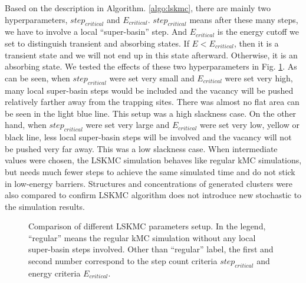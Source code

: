 Based on the description in Algorithm. \ref{algo:lskmc}, there are mainly two hyperparameters, $step_{critical}$ and $E_{critical}$. $step_{critical}$ means after these many steps, we have to involve a local ``super-basin'' step. And $E_{critical}$ is the energy cutoff we set to distinguish transient and absorbing states. If $E < E_{critical}$, then it is a transient state and we will not end up in this state afterward. Otherwise, it is an absorbing state. We tested the effects of these two hyperparameters in Fig. \ref{Chap:Al/Vac:fig:lskmc_time}. As can be seen, when $step_{critical}$ were set very small and $E_{critical}$ were set very high, many local super-basin steps would be included and the vacancy will be pushed relatively farther away from the trapping sites. There was almost no flat area can be seen in the light blue line. This setup was a high slackness case. On the other hand, when $step_{critical}$ were set very large and $E_{critical}$ were set very low, yellow or black line, less local super-basin steps will be involved and the vacancy will not be pushed very far away. This was a low slackness case. When intermediate values were chosen, the \ac{LSKMC} simulation behaves like regular \ac{kMC} simulations, but needs much fewer steps to achieve the same simulated time and do not stick in low-energy barriers.  Structures and concentrations of generated clusters were also compared to confirm \ac{LSKMC} algorithm does not introduce new stochastic to the simulation results.

\begingroup
\begin{figure}[!ht]
  \centering
\caption[Comparison of different \acf{LSKMC} parameters setup.]{Comparison of different \ac{LSKMC} parameters setup. In the legend, ``regular'' means the regular \ac{kMC} simulation without any local super-basin steps involved. Other than ``regular'' label, the first and second number correspond to the step count criteria $step_{critical}$ and energy criteria $E_{critical}$.}
\label{Chap:Al/Vac:fig:lskmc_time}
\end{figure}
\endgroup


